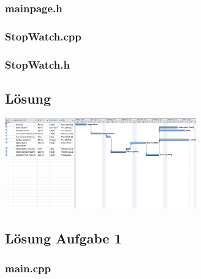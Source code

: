 \subsubsection{mainpage.h}

\subsubsection{StopWatch.cpp}

\subsubsection{StopWatch.h}


\setcounter{section}{7}
\setcounter{subsection}{1}


\setcounter{section}{8}
\setcounter{subsection}{1}

\subsection{Lösung}
\begin{center}
	\includegraphics[angle=90,width=0.62\textwidth]{./UebLoesungen/LoesUeb08_pm2/ueb08_loesung.png}
\end{center}


\setcounter{section}{9}
\setcounter{subsection}{1}


\setcounter{section}{10}
\setcounter{subsection}{1}


\setcounter{section}{11}
\setcounter{subsection}{1}

\subsection{Lösung Aufgabe 1}
\subsubsection{main.cpp}

